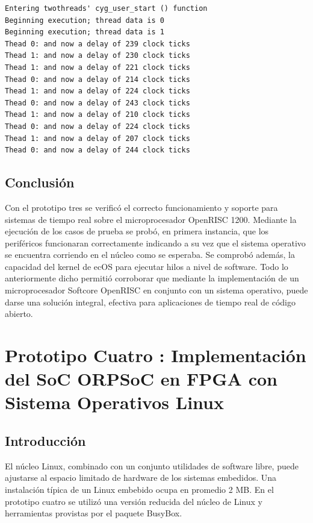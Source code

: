 \newpage
\begin{lstlisting}[frame=single,caption={Salida de la ejecución del programa de prueba twothreads},label={lst:salhilos}]
Entering twothreads' cyg_user_start () function
Beginning execution; thread data is 0
Beginning execution; thread data is 1
Thead 0: and now a delay of 239 clock ticks
Thead 1: and now a delay of 230 clock ticks
Thead 1: and now a delay of 221 clock ticks
Thead 0: and now a delay of 214 clock ticks
Thead 1: and now a delay of 224 clock ticks
Thead 0: and now a delay of 243 clock ticks
Thead 1: and now a delay of 210 clock ticks
Thead 0: and now a delay of 224 clock ticks
Thead 1: and now a delay of 207 clock ticks
Thead 0: and now a delay of 244 clock ticks
\end{lstlisting}

		\section{Conclusión}
		
		Con el prototipo tres se verificó el correcto funcionamiento y soporte para sistemas de tiempo real sobre el microprocesador OpenRISC 1200. Mediante
		la ejecución de los casos de prueba se probó, en primera instancia, que los periféricos funcionaran correctamente indicando a su vez que el sistema
		operativo se encuentra corriendo en el núcleo como se esperaba. Se comprobó además, la capacidad del kernel de ecOS para ejecutar hilos a nivel de software. 
		Todo lo anteriormente dicho permitió corroborar que mediante la implementación de un microprocesador Softcore OpenRISC en conjunto con un sistema
		operativo, puede darse una solución integral, efectiva para aplicaciones de tiempo real de código abierto.
		
\newpage
\chapter{Prototipo Cuatro : Implementación del SoC ORPSoC en FPGA con Sistema Operativos Linux} \label{chap:proto4}
		\section{Introducción}
		El núcleo Linux, combinado con un conjunto utilidades de software libre, puede ajustarse al espacio limitado de hardware 
	    de los sistemas embedidos. Una instalación típica de un Linux embebido ocupa en promedio 2 MB. En el prototipo cuatro se utilizó una versión
	    reducida del núcleo de Linux y herramientas provistas por el paquete BusyBox. 
		
